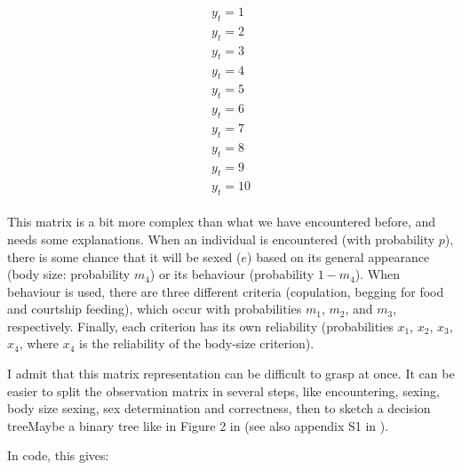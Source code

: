 \documentclass[
  12pt,
]{krantz}
\begin{document}
\[\begin{matrix}
\begin{matrix}
y_{t}=1 \\ y_{t}=2 \\ y_{t}=3 \\ y_{t}=4 \\ y_{t}=5 \\ y_{t}=6 \\ y_{t}=7 \\ y_{t}=8 \\ y_{t}=9 \\ y_{t}=10
\end{matrix}
\end{matrix}\]

This matrix is a bit more complex than what we have encountered before, and needs some explanations. When an individual is encountered (with probability \(p\)), there is some chance that it will be sexed (\(e\)) based on its general appearance (body size: probability \(m_4\)) or its behaviour (probability \(1 - m_4\)). When behaviour is used, there are three different criteria (copulation, begging for food and courtship feeding), which occur with probabilities \(m_1\), \(m_2\), and \(m_3\), respectively. Finally, each criterion has its own reliability (probabilities \(x_1\), \(x_2\), \(x_3\), \(x_4\), where \(x_4\) is the reliability of the body-size criterion).

I admit that this matrix representation can be difficult to grasp at once. It can be easier to split the observation matrix in several steps, like encountering, sexing, body size sexing, sex determination and correctness, then to sketch a decision treeMaybe a binary tree like in Figure 2 in \citet{genovart_exploiting_2012} (see also appendix S1 in \citet{genovart_exploiting_2012}).

In code, this gives:
\end{document}
